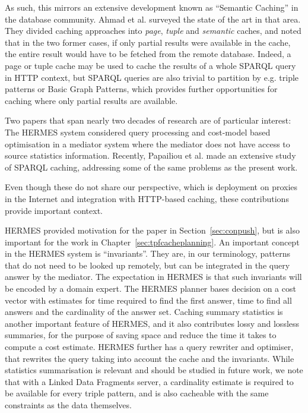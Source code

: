 As such, this mirrors an extensive development known as ``Semantic
Caching'' in the database community. Ahmad et al. \cite{4777801}
surveyed the state of the art in that area. They divided caching
approaches into \emph{page}, \emph{tuple} and \emph{semantic} caches,
and noted that in the two former cases, if only partial results were
available in the cache, the entire result would have to be fetched
from the remote database. Indeed, a page or tuple cache may be used to
cache the results of a whole SPARQL query in HTTP context, but SPARQL
queries are also trivial to partition by e.g. triple patterns or Basic
Graph Patterns, which provides further opportunities for caching where
only partial results are available.

Two papers that span nearly two decades of research are of particular
interest: The HERMES system \cite{adali1996query} considered query
processing and cost-model based optimisation in a mediator system
where the mediator does not have access to source statistics
information. Recently, Papailiou et al. \cite{papailiou2015graph}
made an extensive study of SPARQL caching, addressing some of the same
problems as the present work.

Even though these do not share our perspective, which is deployment on
proxies in the Internet and integration with HTTP-based caching, these
contributions provide important context. 

HERMES \cite{adali1996query} provided motivation for the paper in
Section~\ref{sec:conpush}, but is also important for the work in
Chapter~\ref{sec:tpfcacheplanning}. An important concept in the HERMES
system is ``invariants''. They are, in our terminology, patterns that
do not need to be looked up remotely, but can be integrated in the
query answer by the mediator. The expectation in HERMES is that such
invariants will be encoded by a domain expert. The HERMES planner
bases decision on a cost vector with estimates for time required to
find the first answer, time to find all answers and the cardinality of
the answer set. Caching summary statistics is another important
feature of HERMES, and it also contributes lossy and lossless
summaries, for the purpose of saving space and reduce the time it
takes to compute a cost estimate. HERMES further has a query rewriter
and optimiser, that rewrites the query taking into account the cache
and the invariants. While statistics summarisation is relevant and should be
studied in future work, we note that with a Linked Data Fragments
server, a cardinality estimate is required to be available for every
triple pattern, and is also cacheable with the same constraints as the
data themselves.

